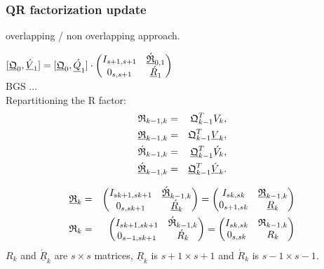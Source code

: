 \documentclass{scrartcl}
\numberwithin{equation}{section}
\begin{document}
\subsubsection{QR factorization update}
overlapping / non overlapping approach.

$[\underline{\frak{Q}}_0, \underline{\acute{V}}_1 ] = [\underline{\frak{Q}}_0, \underline{\acute{Q}}_1 ] \cdot 
\begin{pmatrix}
	I_{s + 1, s + 1} & \underline{\acute{\frak{R}}}_{0,1} \\
	0_{s,s + 1} & \underline{\acute{R}}_1 \\
\end{pmatrix}$ \\

BGS $\ldots$\\

Repartitioning the R factor:
\begin{eqnarray*}
	\frak{R}_{k - 1, k} &=& \frak{Q}_{k - 1}^TV_k,\\
	\underline{\frak{R}}_{k - 1, k} &=& \frak{Q}_{k - 1}^T\underline{V}_k,\\
	\frak{\acute{R}}_{k - 1, k} &=& \underline{\frak{Q}}_{k - 1}^T\acute{V}_k,\\
	\underline{\frak{\acute{R}}}_{k - 1, k} &=& \underline{\frak{Q}}_{k - 1}^T\underline{\acute{V}}_k.
\end{eqnarray*}


\begin{eqnarray*}
\underline{\frak{R}}_k &=&
\begin{pmatrix}
	I_{sk + 1, sk + 1} & \underline{\acute{\frak{R}}}_{k - 1, k} \\
	0_{s, sk + 1} & \underline{\acute{R}}_k \\
\end{pmatrix} = 
\begin{pmatrix}
	I_{sk, sk} & \underline{\frak{R}}_{k - 1, k} \\
	0_{s + 1, sk} & \underline{R}_k \\
\end{pmatrix} \\
\frak{R}_k &=&
\begin{pmatrix}
	I_{sk + 1, sk + 1} & \acute{\frak{R}}_{k - 1, k} \\
	0_{s - 1, sk + 1} & \acute{R}_k \\
\end{pmatrix} = 
\begin{pmatrix}
	I_{sk, sk} & \frak{R}_{k - 1, k} \\
	0_{s, sk} & R_k \\
\end{pmatrix}
\end{eqnarray*}
$R_k$ and $\underline{\acute{R}}_k$ are $s \times s$ matrices, $\underline{R}_k$ is $s + 1 \times s + 1$ and $\acute{R}_k$ is $s - 1 \times s - 1$.
\end{document}
